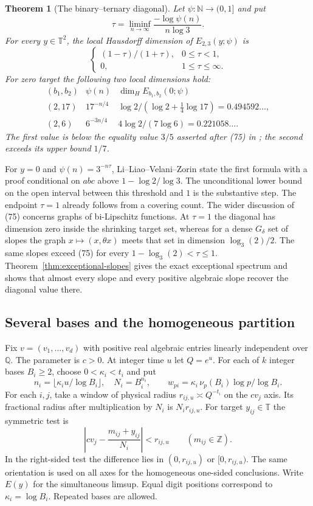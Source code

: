 \documentclass[11pt,reqno,a4paper]{amsart}
\newtheorem{theorem}{Theorem}[section]
\theoremstyle{remark}
\numberwithin{equation}{section}
\begin{document}
\begin{theorem}[The binary--ternary diagonal]\label{thm:llvz}
Let \(\psi:\mathbb N\to(0,1]\) and put
\[\tau=\liminf_{n\to\infty}\frac{-\log\psi(n)}{n\log 3}.\]
For every \(y\in\mathbb T^2\), the local Hausdorff dimension of
\(E_{2,3}(y;\psi)\) is
\[
 \begin{cases}(1-\tau)/(1+\tau),&0\le\tau<1,\\
 0,&1\le\tau\le\infty.\end{cases}
\]
For zero target the following two local dimensions hold:
\[
\begin{array}{ccl}
 (b_1,b_2)&\psi(n)&\dim_H E_{b_1,b_2}(0;\psi)\\[2pt]
 (2,17)&17^{-n/4}&\log 2/(\log 2+\tfrac14\log17)=0.494592\ldots,\\
 (2,6)&6^{-3n/4}&4\log 2/(7\log 6)=0.221058\ldots .
\end{array}
\]
The first value is below the equality value \(3/5\) asserted after (75) in \cite[p.~67]{LLVZ}; the second exceeds its upper bound \(1/7\).
\end{theorem}

For \(y=0\) and \(\psi(n)=3^{-n\tau}\), Li--Liao--Velani--Zorin
\cite[\S5.5, Remark~13]{LLVZ} state the first formula with a proof conditional on \(abc\) above \(1-\log2/\log3\). The unconditional lower bound on the open interval between this threshold and \(1\) is the substantive step. The endpoint \(\tau=1\) already follows from a covering count. The wider discussion of (75) concerns graphs of bi-Lipschitz functions. At \(\tau=1\) the diagonal has dimension zero inside the shrinking target set, whereas for a dense \(G_\delta\) set of slopes the graph \(x\mapsto(x,\theta x)\) meets that set in dimension \(\log_3(2)/2\). The same slopes exceed (75) for every \(1-\log_3(2)<\tau\le1\). Theorem~\ref{thm:exceptional-slopes} gives the exact exceptional spectrum and shows that almost every slope and every positive algebraic slope recover the diagonal value there.

\subsection{Several bases and the homogeneous partition}
Fix \(v=(v_1,\ldots,v_d)\) with positive real algebraic entries linearly independent over \(\mathbb Q\). The parameter is \(c>0\). At integer time \(u\) let \(Q=e^u\).
For each of \(k\) integer bases \(B_i\ge2\), choose \(0<\kappa_i<t_i\) and put
\[
 n_i=\lfloor\kappa_i u/\log B_i\rfloor,\quad N_i=B_i^{n_i},
 \qquad w_{pi}=\kappa_i\,\nu_p(B_i)\log p/\log B_i.
\]
For each \(i,j\), take a window of physical radius \(r_{ij,u}\asymp Q^{-t_i}\) on the \(cv_j\) axis. Its fractional radius after multiplication by \(N_i\) is \(N_i r_{ij,u}\). For target \(y_{ij}\in\mathbb T\) the symmetric test is
\[
 \left|cv_j-\frac{m_{ij}+y_{ij}}{N_i}\right|<r_{ij,u}
 \qquad(m_{ij}\in\mathbb Z).
\]
In the right-sided test the difference lies in \((0,r_{ij,u})\) or \([0,r_{ij,u})\). The same orientation is used on all axes for the homogeneous one-sided conclusions. Write \(E(y)\) for the simultaneous limsup. Equal digit positions correspond to \(\kappa_i=\log B_i\). Repeated bases are allowed.
\end{document}

